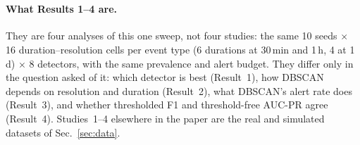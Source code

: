 \documentclass[10pt,twocolumn]{article}
\begin{document}
\begin{table}[t]
\centering\scriptsize\setlength{\tabcolsep}{4pt}
\\[6pt]

\caption{Best and second-best of the eight detectors by AUC-PR at 30\,min (mean$\pm$95\% interval over 10 seeds), with DBSCAN's AUC-PR and realised alert rate; the LSTM-AE and Transformer are never in the top two. Top: level shifts; bottom: variance bursts. $^\dagger$ the two intervals overlap (a tie, not a win).}\label{tab:sweep}
\end{table}

\paragraph{What Results 1--4 are.} They are four analyses of this one sweep, not four studies: the same 10 seeds $\times$ 16 duration--resolution cells per event type (6 durations at 30\,min and 1\,h, 4 at 1\,d) $\times$ 8 detectors, with the same prevalence and alert budget. They differ only in the question asked of it: which detector is best (Result~1), how DBSCAN depends on resolution and duration (Result~2), what DBSCAN's alert rate does (Result~3), and whether thresholded F1 and threshold-free AUC-PR agree (Result~4). Studies~1--4 elsewhere in the paper are the real and simulated datasets of Sec.~\ref{sec:data}.
\end{document}
